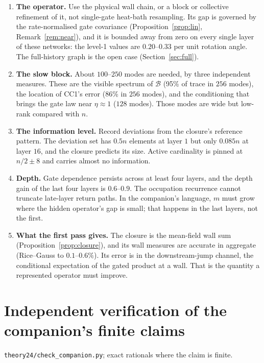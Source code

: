\begin{enumerate}[leftmargin=1.5em]
\item \textbf{The operator.} Use the physical wall chain, or a block or collective refinement of it, not single-gate
heat-bath resampling. Its gap is governed by the rate-normalised gate covariance (Proposition~\ref{prop:lin},
Remark~\ref{rem:near}), and it is bounded away from zero on every single layer of these networks: the level-1 values are
$0.20$--$0.33$ per unit rotation angle. The full-history graph is the open case (Section~\ref{sec:full}).
\item \textbf{The slow block.} About $100$--$250$ modes are needed, by three independent measures. These are the visible
spectrum of $\mathcal B$ (95\% of trace in $256$ modes), the location of CC1's error (86\% in $256$ modes), and the
conditioning that brings the gate law near $\eta\approx1$ ($128$ modes). Those modes are wide but low-rank compared
with $n$.
\item \textbf{The information level.} Record deviations from the closure's reference pattern. The deviation set has
$0.5n$ elements at layer $1$ but only $0.085n$ at layer $16$, and the closure predicts its size. Active cardinality is
pinned at $n/2\pm8$ and carries almost no information.
\item \textbf{Depth.} Gate dependence persists across at least four layers, and the depth gain of the last four layers is
$0.6$--$0.9$. The occupation recurrence cannot truncate late-layer return paths. In the companion's language, $m$ must
grow where the hidden operator's gap is small; that happens in the last layers, not the first.
\item \textbf{What the first pass gives.} The closure is the mean-field wall sum (Proposition~\ref{prop:closure}), and
its wall measures are accurate in aggregate (Rice--Gauss to $0.1$--$0.6\%$). Its error is in the downstream-jump channel,
the conditional expectation of the gated product at a wall. That is the quantity a represented operator must improve.
\end{enumerate}

\appendix
\section{Independent verification of the companion's finite claims}
\texttt{theory24/check\_companion.py}; exact rationals where the claim is finite.

